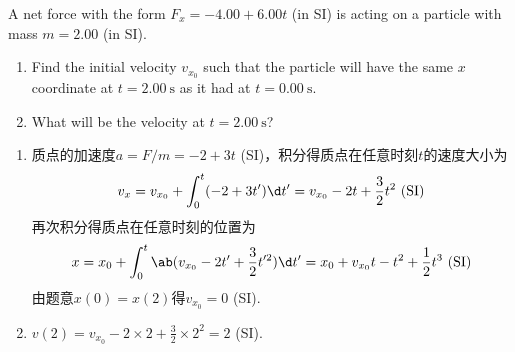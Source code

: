 \begin{problem} %
    A net force with the form $F_x=-4.00+6.00t$ (in SI) is acting on a particle with mass $m=2.00$ (in SI).
    \begin{enumerate}
        \item Find the initial velocity $v_{x_0}$ such that the particle will have the same $x$ coordinate at $t=\qty{2.00}\s$ as it had at $t=\qty{0.00}\s$.
        \item What will be the velocity at $t=\qty{2.00}\s$?
    \end{enumerate}
\end{problem}
\begin{solution}\leavevmode
    \begin{enumerate}
        \item 质点的加速度$a=F/m=-2+3t$ (SI)，积分得质点在任意时刻$t$的速度大小为
        \[v_x=v_{x_0}+\int_0^t(-2+3t')\d t'=v_{x_0}-2t+\frac32t^2\ \text{(SI)}\]
        再次积分得质点在任意时刻的位置为
        \[x=x_0+\int_0^t{\ab(v_{x_0}-2t'+\frac32t'^2)}\d t'=x_0+v_{x_0}t-t^2+\frac12t^3\ \text{(SI)}\]
        由题意$x(0)=x(2)$得$v_{x_0}=0$ (SI).
        \item $v(2)=v_{x_0}-2\times 2+\frac32\times 2^2=2$ (SI).
    \end{enumerate}
\end{solution}

